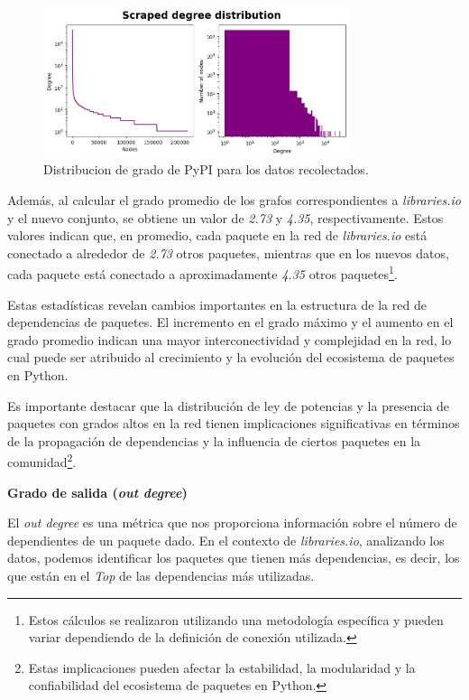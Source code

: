 \begin{figure}[h!]
    \begin{center}
        \includegraphics[width=0.8\textwidth]{img/pypi/scraped_degree_distribution.png}
        \caption{Distribucion de grado de PyPI para los datos recolectados.}
        \label{fig:pypi_scraped_degree_distribution}
    \end{center}
\end{figure}

Además, al calcular el grado promedio de los grafos correspondientes a \textit{libraries.io} y el nuevo
conjunto, se obtiene un valor de \textit{2.73} y \textit{4.35}, respectivamente. Estos valores indican
que, en promedio, cada paquete en la red de \textit{libraries.io} está conectado a alrededor de
\textit{2.73} otros paquetes, mientras que en los nuevos datos, cada paquete está conectado a
aproximadamente \textit{4.35} otros paquetes\footnote{Estos cálculos se realizaron utilizando una
    metodología específica y pueden variar dependiendo de la definición de conexión utilizada.}.

Estas estadísticas revelan cambios importantes en la estructura de la red de dependencias de paquetes.
El incremento en el grado máximo y el aumento en el grado promedio indican una mayor interconectividad
y complejidad en la red, lo cual puede ser atribuido al crecimiento y la evolución del ecosistema de
paquetes en Python.

Es importante destacar que la distribución de ley de potencias y la presencia de paquetes con grados
altos en la red tienen implicaciones significativas en términos de la propagación de dependencias y la
influencia de ciertos paquetes en la comunidad\footnote{Estas implicaciones pueden afectar la
    estabilidad, la modularidad y la confiabilidad del ecosistema de paquetes en Python.}.

\textbf{Grado de salida (\textit{out degree})}

El \textit{out degree} es una métrica que nos proporciona información
sobre el número de dependientes de un paquete dado. En el contexto de \textit{libraries.io},
analizando los datos, podemos identificar los paquetes que tienen más dependencias, es decir,
los que están en el \textit{Top} de las dependencias más utilizadas.


